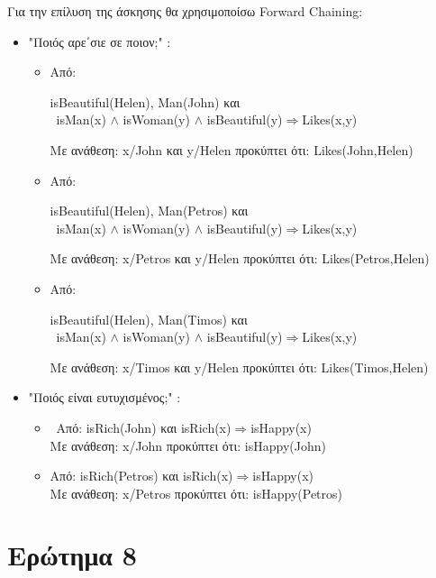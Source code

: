 \documentclass[12pt,a4paper]{article}
\begin{document}
Για την επίλυση της άσκησης θα χρησιμοποίσω \textlatin{Forward Chaining}:\begin{itemize}
\item "Ποιός αρε΄σιε σε ποιον\textlatin{;}" :
\begin{itemize}
\item Από: \begin{center}
\textlatin{isBeautiful(Helen), Man(John)} και \\\ \textlatin{isMan(x) $\wedge$ isWoman(y) $\wedge$ isBeautiful(y)$\Rightarrow$Likes(x,y)}
\end{center}
Με ανάθεση: \textlatin{x/John} και \textlatin{y/Helen} προκύπτει ότι: \textlatin{Likes(John,Helen)}
\item Από: \begin{center}
\textlatin{isBeautiful(Helen), Man(Petros)} και \\\ \textlatin{isMan(x) $\wedge$ isWoman(y) $\wedge$ isBeautiful(y)$\Rightarrow$Likes(x,y)}
\end{center}
Με ανάθεση: \textlatin{x/Petros} και \textlatin{y/Helen} προκύπτει ότι: \textlatin{Likes(Petros,Helen)}
\item Από: \begin{center}
\textlatin{isBeautiful(Helen), Man(Timos)} και \\\ \textlatin{isMan(x) $\wedge$ isWoman(y) $\wedge$ isBeautiful(y)$\Rightarrow$Likes(x,y)}
\end{center}
Με ανάθεση: \textlatin{x/Timos} και \textlatin{y/Helen} προκύπτει ότι: \textlatin{Likes(Timos,Helen)}


\end{itemize}
\item "Ποιός είναι ευτυχισμένος\textlatin{;}" :
\begin{itemize}
\item\ Από: \textlatin{isRich(John)} και \textlatin{isRich(x)$\Rightarrow$isHappy(x)}\\
Με ανάθεση: \textlatin{x/John} προκύπτει ότι: \textlatin{isHappy(John)}
\item Από: \textlatin{isRich(Petros)} και \textlatin{isRich(x)$\Rightarrow$isHappy(x)}\\
Με ανάθεση: \textlatin{x/Petros} προκύπτει ότι: \textlatin{isHappy(Petros)}
\end{itemize}
\end{itemize}




\section*{Ερώτημα 8}
\end{document}
